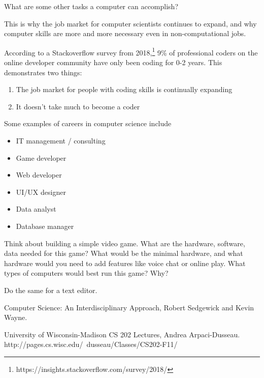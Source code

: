 \begin{exercise}
What are some other tasks a computer can accomplish?
\end{exercise}

This is why the job market for computer scientists continues to expand, and why computer skills are more and more necessary even in non-computational jobs.

According to a Stackoverflow survey from 2018,\footnote{https://insights.stackoverflow.com/survey/2018/} 9\% of professional coders on the online developer community have only been coding for 0-2 years. This demonstrates two things:

\begin{enumerate}
	\item The job market for people with coding skills is continually expanding
	\item It doesn't take much to become a coder
\end{enumerate}

Some examples of careers in computer science include

\begin{itemize}
\item IT management / consulting
\item Game developer
\item Web developer
\item UI/UX designer
\item Data analyst
\item Database manager
\end{itemize}

\begin{exercise}
  Think about building a simple video game. What are the hardware, software,
  data needed for this game? What would be the minimal hardware, and what
  hardware would you need to add features like voice chat or online play. What
  types of computers would best run this game? Why?

  Do the same for a text editor.
\end{exercise}



Computer Science: An Interdisciplinary Approach, Robert Sedgewick and Kevin Wayne.

University of Wisconsin-Madison CS 202 Lectures, Andrea Arpaci-Dusseau.\\http://pages.cs.wisc.edu/~dusseau/Classes/CS202-F11/
